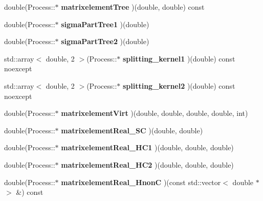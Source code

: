 \begin{DoxyCompactItemize}
\item 
\mbox{\label{classProcess_acf97a283d10f81f42c09fb10c271b9fe}} 
double(Process\+::$\ast$ {\bfseries matrixelement\+Tree} )(double, double) const
\item 
\mbox{\label{classProcess_a6959adc59277bbc489d61acc6ace9f3e}} 
double(Process\+::$\ast$ {\bfseries sigma\+Part\+Tree1} )(double)
\item 
\mbox{\label{classProcess_a27b2b360a232bc072abe0acf511123c3}} 
double(Process\+::$\ast$ {\bfseries sigma\+Part\+Tree2} )(double)
\item 
\mbox{\label{classProcess_a96055c754e57a308742e94cc2eb5341c}} 
std\+::array$<$ double, 2 $>$(Process\+::$\ast$ {\bfseries splitting\+\_\+kernel1} )(double) const noexcept
\item 
\mbox{\label{classProcess_ac5392ca07448c1b08c8513456165d5ee}} 
std\+::array$<$ double, 2 $>$(Process\+::$\ast$ {\bfseries splitting\+\_\+kernel2} )(double) const noexcept
\item 
\mbox{\label{classProcess_aebcafc03257ff5aeca1a3a25e0bd88fe}} 
double(Process\+::$\ast$ {\bfseries matrixelement\+Virt} )(double, double, double, double, int)
\item 
\mbox{\label{classProcess_ae3fcf76ca5dda1c3c44f6308eca25b44}} 
double(Process\+::$\ast$ {\bfseries matrixelement\+Real\+\_\+\+SC} )(double, double)
\item 
\mbox{\label{classProcess_a89b2b63998f4401e9e97eebf9694ac25}} 
double(Process\+::$\ast$ {\bfseries matrixelement\+Real\+\_\+\+H\+C1} )(double, double, double)
\item 
\mbox{\label{classProcess_a2d8b6a1029ed9ea4d5cf96fdd14a53e3}} 
double(Process\+::$\ast$ {\bfseries matrixelement\+Real\+\_\+\+H\+C2} )(double, double, double)
\item 
\mbox{\label{classProcess_aa9861c9231581fd9a17f6ff14885e64a}} 
double(Process\+::$\ast$ {\bfseries matrixelement\+Real\+\_\+\+HnonC} )(const std\+::vector$<$ double $\ast$ $>$ \&) const

\end{DoxyCompactItemize}
